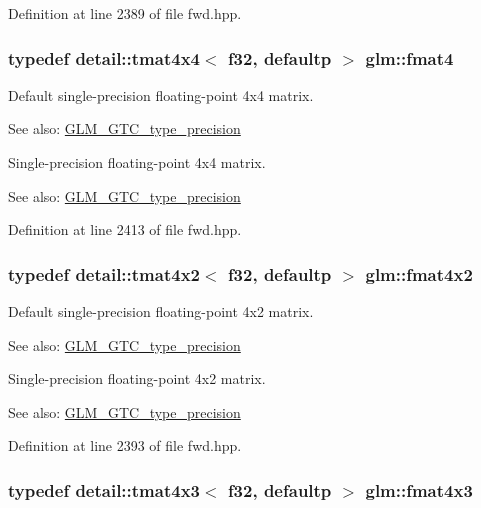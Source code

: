 Definition at line 2389 of file fwd.hpp.\hypertarget{group__gtc__type__precision_gfbea1649c5384f13ff4595c9d0003a68}{
\subsubsection[fmat4]{\setlength{\rightskip}{0pt plus 5cm}typedef detail::tmat4x4$<$ f32, defaultp $>$ {\bf glm::fmat4}}}
\label{group__gtc__type__precision_gfbea1649c5384f13ff4595c9d0003a68}


Default single-precision floating-point 4x4 matrix. \begin{Desc}
\item[See also:]\hyperlink{group__gtc__type__precision}{GLM\_\-GTC\_\-type\_\-precision}\end{Desc}
Single-precision floating-point 4x4 matrix. \begin{Desc}
\item[See also:]\hyperlink{group__gtc__type__precision}{GLM\_\-GTC\_\-type\_\-precision} \end{Desc}


Definition at line 2413 of file fwd.hpp.\hypertarget{group__gtc__type__precision_g0cf4b66f4929b3c21ab7b967386fc7dd}{
\subsubsection[fmat4x2]{\setlength{\rightskip}{0pt plus 5cm}typedef detail::tmat4x2$<$ f32, defaultp $>$ {\bf glm::fmat4x2}}}
\label{group__gtc__type__precision_g0cf4b66f4929b3c21ab7b967386fc7dd}


Default single-precision floating-point 4x2 matrix. \begin{Desc}
\item[See also:]\hyperlink{group__gtc__type__precision}{GLM\_\-GTC\_\-type\_\-precision}\end{Desc}
Single-precision floating-point 4x2 matrix. \begin{Desc}
\item[See also:]\hyperlink{group__gtc__type__precision}{GLM\_\-GTC\_\-type\_\-precision} \end{Desc}


Definition at line 2393 of file fwd.hpp.\hypertarget{group__gtc__type__precision_g5af77d2574bca528d321fbf261c90107}{
\subsubsection[fmat4x3]{\setlength{\rightskip}{0pt plus 5cm}typedef detail::tmat4x3$<$ f32, defaultp $>$ {\bf glm::fmat4x3}}}
\label{group__gtc__type__precision_g5af77d2574bca528d321fbf261c90107}


